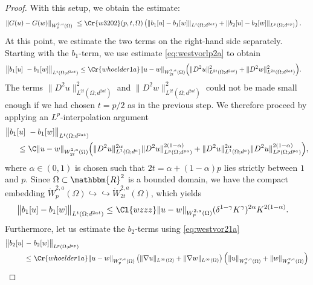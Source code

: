\documentclass[12pt,a4paper,twoside]{article}
\newcommand{\R}{\mathbbm {R}}
\begin{document}
\begin{proof}
With this setup, we obtain the estimate:
\begin{align*}
    \|G (u)-G (w)\|_{W^{2,a}_p(\Omega)} &\ 
     \le 
             \Cr{w3202}(p,t,\Omega) \left(
    \|b_1[u]-b_1[w]\|_{L^{t}(\Omega ;d^{2at})}
   + \|b_2[u]-b_2[w]\|_{L^{p}(\Omega ;d^{ap})}
    \right).
\end{align*}
At this point, we estimate the two terms on the right-hand side separately. Starting with the $b_1$-term, we use estimate \eqref{eq:westvorlp2a} to obtain
\begin{align*}
\big\|b_1[u] &\ -b_1[w] \big\|_{L^{t}(\Omega;d^{2at})} 
\le \Cr{whoelder1a}   \| u-w \|_{W^{2,a}_{2t}(\Omega)} \Big(  \| D^2u \|_{L^{2t}(\Omega;d^{2at})}^2 + \| D^2w \|_{L^{2t}(\Omega;d^{2at})}^2 \Big).
\end{align*}
The terms $\| D^2u \|_{L^{2t}(\Omega;d^{2at})}^2 $ and $\| D^2w \|_{L^{2t}(\Omega;d^{2at})}^2 $ could not be made small enough if we had chosen $t=p/2$ as in the previous step. We therefore proceed by applying an  $L^p$-interpolation argument
\begin{align*}
\big\|b_1[u] &\ -b_1[w] \big\|_{L^{t}(\Omega;d^{2at})} \\
\le &\
\C \| u-w \|_{W^{2,a}_{2t}(\Omega)}\Big( \| D^2u \|_{L^{1}(\Omega;d^{a})}^{2\alpha} \| D^2u \|_{L^{p}(\Omega;d^{pa})} ^{2(1-\alpha)}+ \| D^2u \|_{L^{1}(\Omega;d^{a})}^{2\alpha} \| D^2u \|_{L^{p}(\Omega;d^{pa})} ^{2(1-\alpha)} \Big),   
\end{align*}
where  $\alpha\in(0,1)$  is chosen such that  $2t=\alpha  +(1-\alpha)p$ lies strictly between $1$ and $p$. Since $\Omega\subset\R^2$ is a bounded domain, we have the compact embedding $\mathring W^{2,a}_p(\Omega)\hookrightarrow\hookrightarrow \mathring W^{2,a}_{2t}(\Omega)$, which yields
\begin{align*}
\big\|b_1[u]-b_1[w] \big\|_{L^{t}(\Omega;d^{2at})}
\le &\ \Cl{wzzz} \| u-w \|_{W^{2,a}_p(\Omega)}  (\delta^{1-\gamma}K^\gamma)^{2\alpha} K ^{2(1-\alpha)} .
\end{align*}
Furthermore, let us estimate the $b_2$-terms using \eqref{eq:westvor21a}
\begin{align*}
 \big\| b_2[u]\ - &\ b_2[w]\big\|_{L^{p}(\Omega;d^{ap})} \\
 \ \le &\ \Cr{whoelder1a}    \|u-w \|_{W^{2,a}_p({\Omega})} 
       \left(
 \|\nabla u\| _{L^\infty({\Omega})} +\|\nabla w\| _{L^\infty({\Omega})} 
               \right)  
               \left(
 \| u\| _{W^{2,a}_p(\Omega)} +\|w\| _{W^{2,a}_p(\Omega)} 
               \right)\\

\end{align*}
\end{proof}
\end{document}
